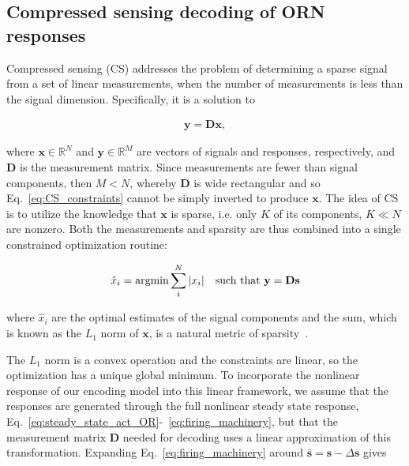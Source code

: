 \documentclass[9pt,lineno]{elife}
\begin{document}



\subsection{Compressed sensing decoding of ORN responses} 




Compressed sensing (CS) addresses the problem of determining a sparse signal from a set of linear measurements, when the number of measurements is less than the signal dimension. Specifically, it is a solution to 

\begin{align}
\mathbf y = \mathbf D\mathbf x,
\label{eq:CS_constraints}
\end{align} 

where $\mathbf x \in \mathbb{R}^N$ and $\mathbf y\in \mathbb{R}^M$ are vectors of signals and responses, respectively, and $\mathbf D$ is the measurement matrix. Since measurements are fewer than signal components, then $M < N$, whereby $\mathbf D$ is wide rectangular and so Eq.~\ref{eq:CS_constraints} cannot be simply inverted to produce $\mathbf x$. The idea of CS is to utilize the knowledge that $\mathbf x$ is sparse, i.e. only $K$ of its components, $K \ll N$ are nonzero. Both the measurements and sparsity are thus combined into a single constrained optimization routine:

\begin{align}
\hat x_i = \textup{argmin} \sum_i^N |x_i| \quad \textup{such that } \mathbf y = \mathbf D\mathbf s
\label{eq:CS}
\end{align}

where $\hat x_i$ are the optimal estimates of the signal components and the sum, which is known as the $L_1$ norm of $\mathbf x$, is a natural metric of sparsity~\citep{CS_donoho}. 

The $L_1$ norm is a convex operation and the constraints are linear, so the optimization has a unique global minimum. To incorporate the nonlinear response of our encoding model into this linear framework, we assume that the responses are generated through the full nonlinear steady state response, Eq.~\ref{eq:steady_state_act_OR}-~\ref{eq:firing_machinery}, but that the measurement matrix $\mathbf D$ needed for decoding uses a linear approximation of this transformation.  Expanding Eq.~\ref{eq:firing_machinery} around $\bar{\mathbf s} = \mathbf s - \Delta \mathbf s$ gives
\end{document}
